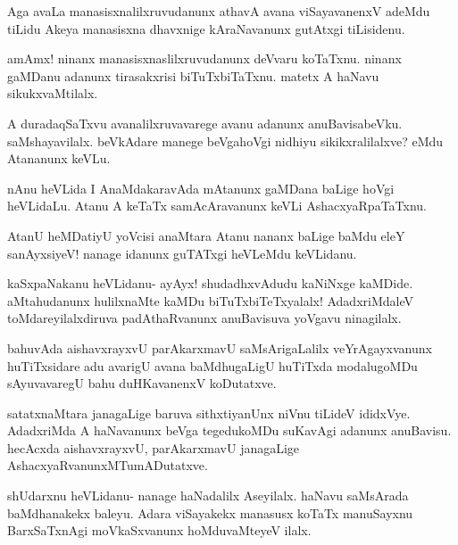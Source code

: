 \documentclass{article}
\begin{document}
\begin{mng}%
Aga avaLa manasisxnalilxruvudanunx athavA avana viSayavanenxV
adeMdu tiLidu Akeya manasisxna dhavxnige kAraNavanunx gutAtxgi tiLisidenu.
\end{mng}

\begin{mng}%
amAmx! ninanx manasisxnaslilxruvudanunx deVvaru koTaTxnu. ninanx
gaMDanu adanunx tirasakxrisi biTuTxbiTaTxnu. matetx A haNavu sikukxvaMtilalx.
\end{mng}

\begin{mng}%
A duradaqSaTxvu avanalilxruvavarege avanu adanunx anuBavisabeVku.
saMshayavilalx. beVkAdare manege beVgahoVgi nidhiyu sikikxralilalxve?
eMdu Atananunx keVLu.
\end{mng}

\begin{mng}%
nAnu heVLida I AnaMdakaravAda mAtanunx gaMDana baLige
hoVgi heVLidaLu. Atanu A keTaTx samAcAravanunx keVLi AshacxyaRpaTaTxnu.
\end{mng}

\begin{mng}%
AtanU heMDatiyU yoVcisi anaMtara Atanu nananx baLige
baMdu eleY sanAyxsiyeV! nanage idanunx guTATxgi heVLeMdu keVLidanu.
\end{mng}

\begin{mng}%
kaSxpaNakanu heVLidanu- ayAyx! shudadhxvAdudu kaNiNxge kaMDide.
aMtahudanunx hulilxnaMte kaMDu biTuTxbiTeTxyalalx! AdadxriMdaleV toMdareyilalxdiruva
padAthaRvanunx anuBavisuva yoVgavu ninagilalx.
\end{mng}

\begin{mng}%
bahuvAda aishavxrayxvU parAkarxmavU saMsArigaLalilx veYrAgayxvanunx
huTiTxsidare adu avarigU avana baMdhugaLigU huTiTxda modalugoMDu
sAyuvavaregU bahu duHKavanenxV koDutatxve.
\end{mng}

\begin{mng}%
satatxnaMtara janagaLige baruva sithxtiyanUnx niVnu tiLideV
ididxVye. AdadxriMda A haNavanunx beVga tegedukoMDu suKavAgi adanunx
anuBavisu. hecAcxda aishavxrayxvU, parAkarxmavU janagaLige AshacxyaRvanunxMTumADutatxve.
\end{mng}

\begin{mng}%
shUdarxnu heVLidanu- nanage haNadalilx Aseyilalx. haNavu saMsArada
baMdhanakekx baleyu. Adara viSayakekx manasusx koTaTx manuSayxnu
BarxSaTxnAgi moVkaSxvanunx hoMduvaMteyeV ilalx.
\end{mng}
\end{document}
